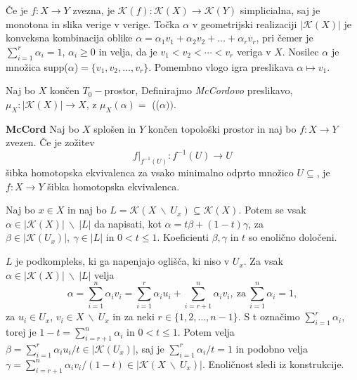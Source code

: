 \documentclass[mat1]{fmfdelo}
\begin{document}
Če je $f\colon  X\rightarrow Y$ zvezna, je $\mathcal{K}(f)\colon \mathcal{K}(X) \rightarrow \mathcal{K}(Y)$ simplicialna, saj je monotona in slika verige v verige.
Točka $\alpha$ v geometrijski realizaciji $|\mathcal{K}(X)|$ je
konveksna kombinacija oblike
$\alpha = \alpha_1 v_1+\alpha_2v_2 + \ldots + \alpha_r v_r$, pri čemer je
$\sum_{i=1}^{r}\alpha_i=1$, $\alpha_i \ge 0$ in 
velja, da je $v_1 < v_2 < \cdots < v_r$ veriga v $X$.
Nosilec $\alpha$ je množica supp($\alpha$)$= \{v_1,v_2,\ldots,v_r\}$. Pomembno vlogo igra 
 preslikava $\alpha \mapsto v_1$.

 \begin{definicija}
    Naj bo $X$ končen $T_0-$prostor, Definirajmo
    \emph{McCordovo} preslikavo, $\mu_X\colon |\mathcal{K}
    (X)|\rightarrow X$, z $\mu_X(\alpha) =$
    (($\alpha))$.
\end{definicija}



\begin{izrek}\textbf{McCord} \cite[izrek 1.4.2]{barmak} %
    Naj bo $X$ splošen in $Y$ končen topološki prostor in naj bo $f\colon X\rightarrow Y$ zvezen. Če je zožitev
    $$
    f|_{f^{-1}(U)}\colon f^{-1}(U)\rightarrow U
    $$
    šibka homotopska ekvivalenca za vsako minimalno odprto množico $U\subseteq$, je $f\colon X\rightarrow Y$  šibka homotopska ekvivalenca.
\label{iz:mccord}
\end{izrek}





\begin{lema}
    Naj bo $x\in X$ in naj bo $L=\mathcal{K} (X\ \backslash \ U_x) \subseteq \mathcal{K}(X)$. Potem se vsak $\alpha \in |\mathcal{K}(X)|\ \backslash \ |L|$ da napisati, kot $\alpha = t\beta + (1-t)\gamma$, za $\beta \in |\mathcal{K}(U_x)|, \ \gamma \in |L|$ in $0<t\leq 1$. Koeficienti $\beta, \gamma$ in $t$ so enolično določeni.
\label{lem:sibka}
\end{lema}

\begin{dokaz}
    $L$ je podkompleks, ki ga napenjajo oglišča, ki niso v $U_x$. Za vsak $\alpha \in |\mathcal{K}(X)|\ \backslash \ |L|$ velja 
    $$\alpha = \sum_{i=1}^{n} \alpha_i v_i 
    = \sum_{i=1}^{r} \alpha_i u_i + \sum_{i=r+1}^{n}\alpha_i v_i,\ \text{za}\ \sum_{i=1}^{n} \alpha_i=1,
    $$
    za $u_i \in U_x$, $v_i \in X \ \backslash \ U_x$ in za neki $r\in \{1,2, \ldots, n-1\}$. S t označimo $\sum_{i=1}^{r} \alpha_i$, torej je $1-t=\sum_{i=r+1}^{n} \alpha_i$ in $0<t\leq 1$. Potem velja $\beta =\sum_{i=1}^{r} \alpha_i u_i/t \in |\mathcal{K}(U_x)|$, saj je $\sum_{i=1}^{r} \alpha_i/t=1$ in podobno velja $\gamma=\sum_{i=r+1}^{n} 
    \alpha_i v_i/(1-t) \in |\mathcal{K}(X \ \backslash \ U_x)|$. Enoličnost sledi iz konstrukcije.

\end{dokaz}
\end{document}
